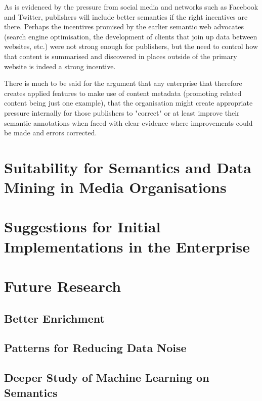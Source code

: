 As is evidenced by the pressure from social media and networks such as
Facebook and Twitter, publishers will include better semantics if the right
incentives are there. Perhaps the incentives promised by the earlier semantic
web advocates (search engine optimisation, the development of clients that
join up data between websites, etc.) were not strong enough for publishers,
but the need to control how that content is summarised and discovered in
places outside of the primary website is indeed a strong incentive.

There is much to be said for the argument that any enterprise that therefore
creates applied features to make use of content metadata (promoting related
content being just one example), that the organisation might create appropriate
pressure internally for those publishers to "correct" or at least improve
their semantic annotations when faced with clear evidence where improvements
could be made and errors corrected.

\section{Suitability for Semantics and Data Mining in Media Organisations}



\section{Suggestions for Initial Implementations in the Enterprise}

\section{Future Research}
\subsection{Better Enrichment}
\subsection{Patterns for Reducing Data Noise}
\subsection{Deeper Study of Machine Learning on Semantics}

